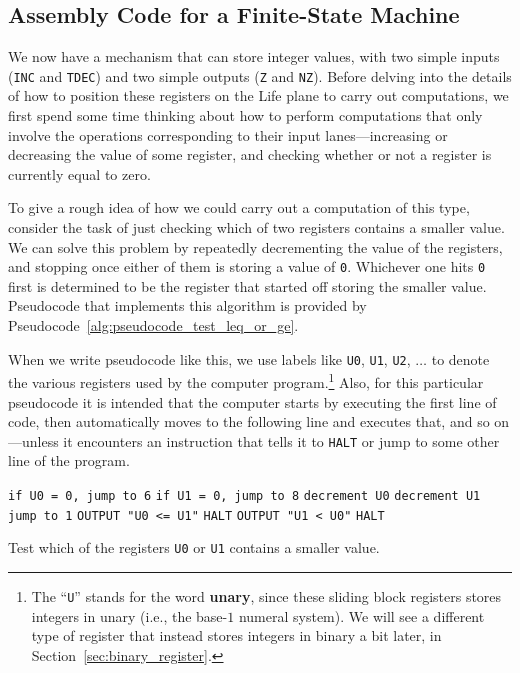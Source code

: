 \subsection{Assembly Code for a Finite-State Machine}\label{sec:finite_state_machine}

We now have a mechanism that can store integer values, with two simple inputs (\texttt{INC} and \texttt{TDEC}) and two simple outputs (\texttt{Z} and \texttt{NZ}). Before delving into the details of how to position these registers on the Life plane to carry out computations, we first spend some time thinking about how to perform computations that only involve the operations corresponding to their input lanes---increasing or decreasing the value of some register, and checking whether or not a register is currently equal to zero.

To give a rough idea of how we could carry out a computation of this type, consider the task of just checking which of two registers contains a smaller value. We can solve this problem by repeatedly decrementing the value of the registers, and stopping once either of them is storing a value of \texttt{0}. Whichever one hits \texttt{0} first is determined to be the register that started off storing the smaller value. Pseudocode that implements this algorithm is provided by Pseudocode~\ref{alg:pseudocode_test_leq_or_ge}.

When we write pseudocode like this, we use labels like \texttt{U0}, \texttt{U1}, \texttt{U2}, $\ldots$ to denote the various registers used by the computer program.\footnote{The ``\texttt{U}'' stands for the word \textbf{unary}, since these sliding block registers stores integers in unary (i.e., the base-$1$ numeral system). We will see a different type of register that instead stores integers in binary a bit later, in Section~\ref{sec:binary_register}.} Also, for this particular pseudocode it is intended that the computer starts by executing the first line of code, then automatically moves to the following line and executes that, and so on---unless it encounters an instruction that tells it to \texttt{HALT} or jump to some other line of the program.

\begin{pseudocode}[!htb]
	\begin{algorithmic}[1]\small
		\State \texttt{if U0 = 0, jump to 6}
		\State \texttt{if U1 = 0, jump to 8}
		\State \texttt{decrement U0}
		\State \texttt{decrement U1}
		\State \texttt{jump to 1}
		\State \texttt{OUTPUT "U0 <= U1"}
		\State \texttt{HALT}
		\State \texttt{OUTPUT "U1 < U0"}
		\State \texttt{HALT}
	\end{algorithmic}
	\caption{Test which of the registers \texttt{U0} or \texttt{U1} contains a smaller value.}\label{alg:pseudocode_test_leq_or_ge}
\end{pseudocode}

